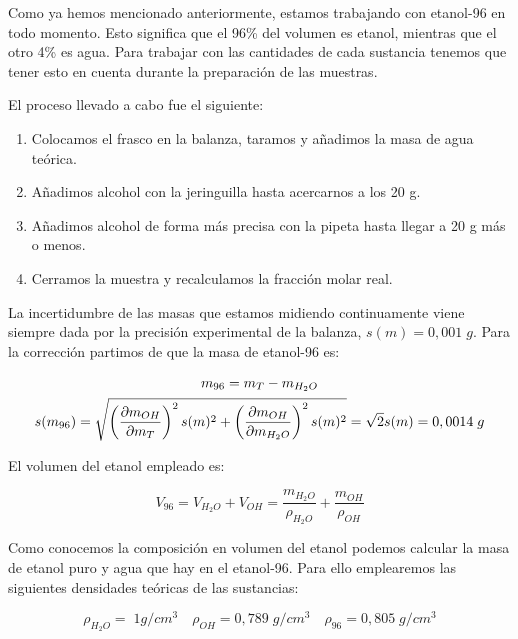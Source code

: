 \documentclass[a4paper,12pt,titlepage]{article}
\begin{document}
Como ya hemos mencionado anteriormente, estamos trabajando con etanol-96 en todo momento. Esto significa que el 96\% del volumen es etanol, mientras que el otro 4\% es agua. Para trabajar con las cantidades de cada sustancia tenemos que tener esto en cuenta durante la preparación de las muestras.

El proceso llevado a cabo fue el siguiente:

\begin{enumerate}
    \item Colocamos el frasco en la balanza, taramos y añadimos la masa de agua teórica.
    \item Añadimos alcohol con la jeringuilla hasta acercarnos a los 20 g.
    \item Añadimos alcohol de forma más precisa con la pipeta hasta llegar a 20 g más o menos.
    \item Cerramos la muestra y recalculamos la fracción molar real.
\end{enumerate}

La incertidumbre de las masas que estamos midiendo continuamente viene siempre dada por la precisión experimental de la balanza, $s(m)=0,001\;g$. Para la corrección partimos de que la masa de etanol-96 es:

\begin{equation}
    \begin{gathered}
        m_{96} = m_T-m_{H_2O} \\
        s(m_{96}) = \sqrt{\left(\pdv{m_{OH}}{m_T}\right)^2s(m)^2+\left(\pdv{m_{OH}}{m_{H_2O}}\right)^2s(m)^2} = \sqrt{2}s(m) = 0,0014 \;g
    \end{gathered}
\end{equation}

El volumen del etanol empleado es:

\begin{equation}
    V_{96} = V_{H_2O} + V_{OH} = \frac{m_{H_2O}}{\rho_{H_2O}} + \frac{m_{OH}}{\rho_{OH}}
\end{equation}

Como conocemos la composición en volumen del etanol podemos calcular la masa de etanol puro y agua que hay en el etanol-96. Para ello emplearemos las siguientes densidades teóricas de las sustancias:

\begin{equation}
    \rho_{H_2O} = \;1g/cm^3 \quad \rho_{OH} = 0,789 \;g/cm^3 \quad \rho_{96} = 0,805 \;g/cm^3
\end{equation}
\end{document}
